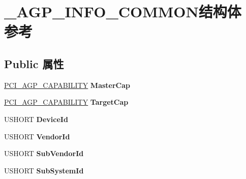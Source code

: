 \hypertarget{struct___a_g_p___i_n_f_o___c_o_m_m_o_n}{}\section{\+\_\+\+A\+G\+P\+\_\+\+I\+N\+F\+O\+\_\+\+C\+O\+M\+M\+O\+N结构体 参考}
\label{struct___a_g_p___i_n_f_o___c_o_m_m_o_n}
\subsection*{Public 属性}
\begin{DoxyCompactItemize}
\item 
\mbox{\label{struct___a_g_p___i_n_f_o___c_o_m_m_o_n_a0251acd0d11d56877dde91c050c10dee}} 
\hyperlink{struct___p_c_i___a_g_p___c_a_p_a_b_i_l_i_t_y}{P\+C\+I\+\_\+\+A\+G\+P\+\_\+\+C\+A\+P\+A\+B\+I\+L\+I\+TY} {\bfseries Master\+Cap}
\item 
\mbox{\label{struct___a_g_p___i_n_f_o___c_o_m_m_o_n_a7fc60531ac809c48a558eded44e6fb90}} 
\hyperlink{struct___p_c_i___a_g_p___c_a_p_a_b_i_l_i_t_y}{P\+C\+I\+\_\+\+A\+G\+P\+\_\+\+C\+A\+P\+A\+B\+I\+L\+I\+TY} {\bfseries Target\+Cap}
\item 
\mbox{\label{struct___a_g_p___i_n_f_o___c_o_m_m_o_n_a2ab955d1131a715aa8cff840e1fc1523}} 
U\+S\+H\+O\+RT {\bfseries Device\+Id}
\item 
\mbox{\label{struct___a_g_p___i_n_f_o___c_o_m_m_o_n_a1b7576c6fbb7d8b96d49c13916492a8e}} 
U\+S\+H\+O\+RT {\bfseries Vendor\+Id}
\item 
\mbox{\label{struct___a_g_p___i_n_f_o___c_o_m_m_o_n_a60ad5e784d6f6e5682fc598691357c7f}} 
U\+S\+H\+O\+RT {\bfseries Sub\+Vendor\+Id}
\item 
\mbox{\label{struct___a_g_p___i_n_f_o___c_o_m_m_o_n_aee716663cea3ddf0607a31eca3d0c66b}} 
U\+S\+H\+O\+RT {\bfseries Sub\+System\+Id}
\item 
\mbox{\label{struct___a_g_p___i_n_f_o___c_o_m_m_o_n_a0093c2c85f6cba0c332a8097167972b8}} 

\end{DoxyCompactItemize}
